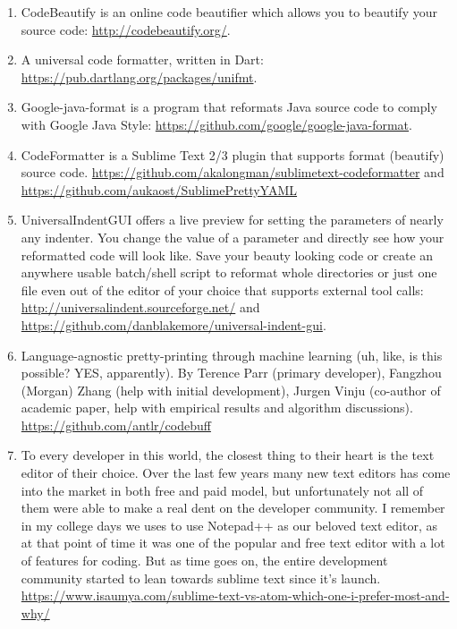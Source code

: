 \begin{sloppypar}
\begin{bluebox}\RaggedRight
\begin{enumerate}[leftmargin=*,parsep=0pt]

    \item CodeBeautify is an online code beautifier which allows you to beautify
    your source code: \url{http://codebeautify.org/}.

    \item A universal code formatter, written in Dart:
    \url{https://pub.dartlang.org/packages/unifmt}.

    \item Google-java-format is a program that reformats Java source code to
    comply with Google Java Style:
    \url{https://github.com/google/google-java-format}.

    \item CodeFormatter is a Sublime Text 2/3 plugin that supports format
    (beautify) source code.
    \url{https://github.com/akalongman/sublimetext-codeformatter} and
    \url{https://github.com/aukaost/SublimePrettyYAML}

    \item UniversalIndentGUI offers a live preview for setting the parameters of
    nearly any indenter. You change the value of a parameter and directly see
    how your reformatted code will look like. Save your beauty looking code or
    create an anywhere usable batch/shell script to reformat whole directories
    or just one file even out of the editor of your choice that supports
    external tool calls: \url{http://universalindent.sourceforge.net/} and
    \url{https://github.com/danblakemore/universal-indent-gui}.

    \item Language-agnostic pretty-printing through machine learning (uh, like,
    is this possible? YES, apparently). By Terence Parr (primary developer),
    Fangzhou (Morgan) Zhang (help with initial development), Jurgen Vinju
    (co-author of academic paper, help with empirical results and algorithm
    discussions). \url{https://github.com/antlr/codebuff}

    \item To every developer in this world, the closest thing to their heart is
    the text editor of their choice. Over the last few years many new text
    editors has come into the market in both free and paid model, but
    unfortunately not all of them were able to make a real dent on the developer
    community. I remember in my college days we uses to use Notepad++ as our
    beloved text editor, as at that point of time it was one of the popular and
    free text editor with a lot of features for coding. But as time goes on, the
    entire development community started to lean towards sublime text since it’s
    launch.
    \url{https://www.isaumya.com/sublime-text-vs-atom-which-one-i-prefer-most-and-why/}


\end{enumerate}
\end{bluebox}
\end{sloppypar}
